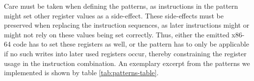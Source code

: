 Care must be taken when defining the patterns, as instructions in the pattern might set other register values as a side-effect.
These side-effects must be preserved when replacing the instruction sequences, as later instructions might or might not rely on these values being set correctly.
Thus, either the emitted x86-64 code has to set these registers as well, or the pattern has to only be applicable if no such writes into later used registers occur, thereby constraining the register usage in the instruction combination.
An exemplary excerpt from the patterns we implemented is shown by table \ref{tab:patterns-table}.

\begin{table*}[t]
	\centering
	\ttfamily
	\small
	\caption[Patterns used for macro-op-fusion]%
	{Some examples of patterns currently fused by the translator, the last five taken from the RISC-V emulator project rv8~\cite{clark2017rv8}.}
	\label{tab:patterns-table}
\end{table*}















